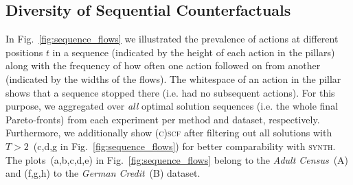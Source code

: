\documentclass[runningheads, envcountsame, a4paper]{llncs}
\newcommand{\oursBoth}{\textsc{(c)scf}}
\newcommand{\competitor}{\textsc{synth}}
\newcommand{\adultDataset}{\emph{Adult Census}}
\newcommand{\germanDataset}{\emph{German Credit}}
\begin{document}
\subsection{Diversity of Sequential Counterfactuals}
\label{sec:exp_sequence_order}
In Fig.~\ref{fig:sequence_flows} we illustrated the prevalence of actions at different positions $t$ in a sequence (indicated by the height of each action in the pillars) along with the frequency of how often one action followed on from another (indicated by the widths of the flows). The whitespace of an action in the pillar shows that a sequence stopped there (i.e. had no subsequent actions).
For this purpose, we aggregated over \emph{all} optimal solution sequences (i.e. the whole final Pareto-fronts) from each experiment per method and dataset, respectively. Furthermore, we additionally show \oursBoth{} after filtering out all solutions with $T > 2$~(c,d,g in Fig.~\ref{fig:sequence_flows}) for better comparability with \competitor{}.
The plots~(a,b,c,d,e) in Fig.~\ref{fig:sequence_flows} belong to the \adultDataset{}~(A) and (f,g,h) to the \germanDataset{}~(B) dataset. 
\end{document}
